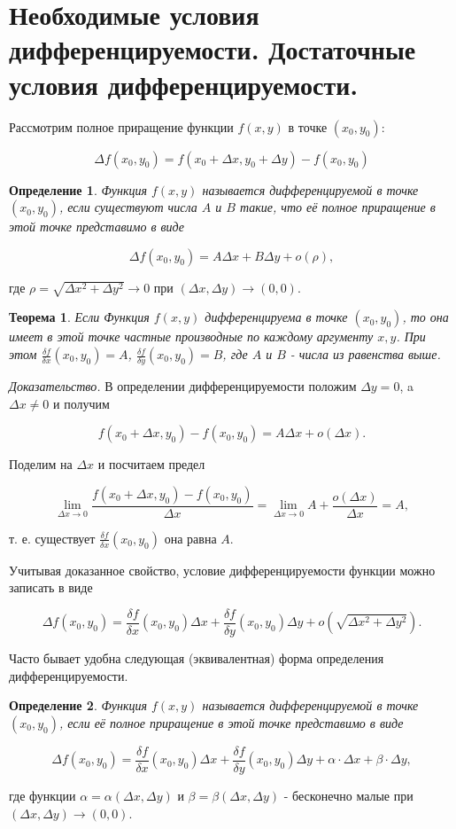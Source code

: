 \documentclass[a4paper,14pt]{article}
\newtheorem{theorem}{Теорема}
\newtheorem{definition}{Определение}
\begin{document}
    \section{Необходимые условия дифференцируемости. Достаточные условия дифференцируемости.}

    Рассмотрим полное приращение функции $f(x,y)$ в точке $(x_0,y_0)$:

    $$\Delta{f(x_0,y_0)}=f(x_0+\Delta{x},y_0+\Delta{y})-f(x_0,y_0)$$

    \begin{definition}
        Функция $f(x,y)$ называется \textit{дифференцируемой} в точке $(x_0,y_0)$, если существуют числа $A$ и $B$
        такие, что её полное приращение в этой точке представимо в виде
    \end{definition}

    $$\Delta{f(x_0,y_0)}=A\Delta{x}+B\Delta{y}+o(\rho),$$

    где $\rho=\sqrt{\Delta{x^2}+\Delta{y^2}}\to{0}$ при $(\Delta{x},\Delta{y})\to(0,0)$.

    \begin{theorem}
        Если Функция $f(x,y)$ дифференцируема в точке $(x_0,y_0)$, то она имеет в этой точке частные производные по каждому аргументу $x,y$.
        При этом $\frac{\delta{f}}{\delta{x}}(x_0,y_0)=A$, $\frac{\delta{f}}{\delta{y}}(x_0,y_0)=B$,
        где $A$ и $B$ - числа из равенства выше.
    \end{theorem}

    \textit{Доказательство.}
    В определении дифференцируемости положим $\Delta{y}=0$, a $\Delta{x}\neq{0}$ и получим

    $$f(x_0+\Delta{x},y_0)-f(x_0,y_0)=A\Delta{x}+o(\Delta{x}).$$

    Поделим на $\Delta{x}$ и посчитаем предел

    $$\lim_{\Delta{x}\to{0}}\frac{f(x_0+\Delta{x},y_0)-f(x_0,y_0)}{\Delta{x}}=\lim_{\Delta{x}\to{0}}A+\frac{o(\Delta{x})}{\Delta{x}}=A,$$

    т. е. существует $\frac{\delta{f}}{\delta{x}}(x_0,y_0)$  она равна $A$.

    Учитывая доказанное свойство, условие дифференцируемости функции можно записать в виде

    $$\Delta{f(x_0,y_0)}=\frac{\delta{f}}{\delta{x}}(x_0,y_0)\Delta{x}+\frac{\delta{f}}{\delta{y}}(x_0,y_0)\Delta{y}+o(\sqrt{\Delta{x^2}+\Delta{y^2}}).$$

    Часто бывает удобна следующая (эквивалентная) форма определения дифференцируемости.

    \begin{definition}
        Функция $f(x,y)$ называется \textit{дифференцируемой} в точке $(x_0,y_0)$, если её полное приращение в этой точке представимо в виде
    \end{definition}

    $$\Delta{f(x_0,y_0)}=\frac{\delta{f}}{\delta{x}}(x_0,y_0)\Delta{x}+\frac{\delta{f}}{\delta{y}}(x_0,y_0)\Delta{y}+\alpha\cdot\Delta{x}+\beta\cdot\Delta{y},$$
    
    где функции $\alpha=\alpha(\Delta{x},\Delta{y})$ и $\beta=\beta(\Delta{x},\Delta{y})$ - бесконечно малые при $(\Delta{x},\Delta{y})\to(0,0)$.
\end{document}

